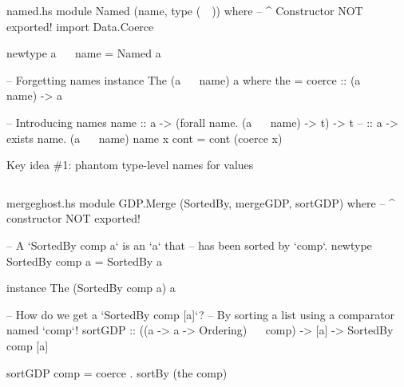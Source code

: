 \documentclass{beamer}
\begin{document}

\begin{filecontents*}{named.hs}
module Named (name, type (~~)) where
                      -- ^ Constructor NOT exported!
import Data.Coerce

newtype a ~~ name = Named a

-- Forgetting names
instance The (a ~~ name) a where
    the = coerce :: (a ~~ name) -> a

-- Introducing names
name :: a -> (forall name. (a ~~ name) -> t) -> t
--   :: a ->  exists name. (a ~~ name)
name x cont = cont (coerce x)
\end{filecontents*}

\begin{frame}{Key idea \#1: phantom type-level names for values}
\inputminted{haskell}{named.hs}
\end{frame}


\begin{filecontents*}{mergeghost.hs}
module GDP.Merge (SortedBy, mergeGDP, sortGDP) where
                  -- ^ constructor NOT exported!

-- A `SortedBy comp a` is an `a` that
-- has been sorted by `comp`.
newtype SortedBy comp a = SortedBy a

instance The (SortedBy comp a) a

-- How do we get a `SortedBy comp [a]`?
-- By sorting a list using a comparator named `comp`!
sortGDP :: ((a -> a -> Ordering) ~~ comp)
        -> [a]
        -> SortedBy comp [a]

sortGDP comp = coerce . sortBy (the comp)
\end{filecontents*}
\end{document}
